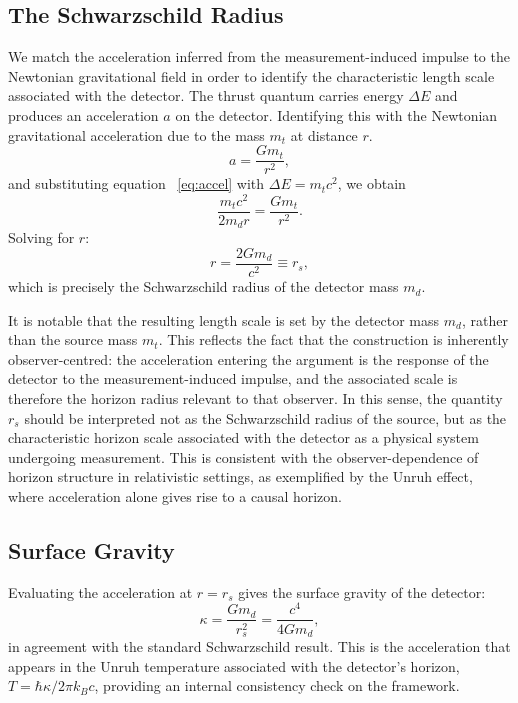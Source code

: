 \documentclass[12pt,a4paper]{article}
\begin{document}
\subsection{The Schwarzschild Radius}
We match the acceleration inferred from the measurement-induced impulse to the Newtonian gravitational field in order to identify the characteristic length scale associated with the detector. The thrust quantum carries energy $\Delta E$ and produces an acceleration $a$ on the detector. Identifying this with the Newtonian gravitational acceleration due to the mass $m_t$ at distance $r$.
\begin{equation}
a = \frac{G m_t}{r^2},
\end{equation}
and substituting equation ~\eqref{eq:accel} with $\Delta E=m_t c^2$, we obtain
\begin{equation}
\frac{m_t c^2}{2 m_d r} = \frac{G m_t}{r^2}.
\end{equation}
Solving for $r$:
\begin{equation}
r = \frac{2 G m_d}{c^2} \equiv r_s,
\end{equation}
which is precisely the Schwarzschild radius of the detector mass $m_d$.

It is notable that the resulting length scale is set by the detector mass $m_d$, rather than the source mass $m_t$. This reflects the fact that the construction is inherently observer-centred: the acceleration entering the argument is the response of the detector to the measurement-induced impulse, and the associated scale is therefore the horizon radius relevant to that observer. In this sense, the quantity $r_s$  should be interpreted not as the Schwarzschild radius of the source, but as the characteristic horizon scale associated with the detector as a physical system undergoing measurement. This is consistent with the observer-dependence of horizon structure in relativistic settings, as exemplified by the Unruh effect, where acceleration alone gives rise to a causal horizon.

\subsection{Surface Gravity}
Evaluating the acceleration at $r = r_s$ gives the surface gravity of the detector:
\begin{equation}
\kappa = \frac{G m_d}{r_s^2} = \frac{c^4}{4 G m_d},
\end{equation}
in agreement with the standard Schwarzschild result. This is the acceleration that appears in the Unruh temperature associated with the detector's horizon, $T = \hbar \kappa / 2\pi k_B c$, providing an internal consistency check on the framework.
\end{document}
